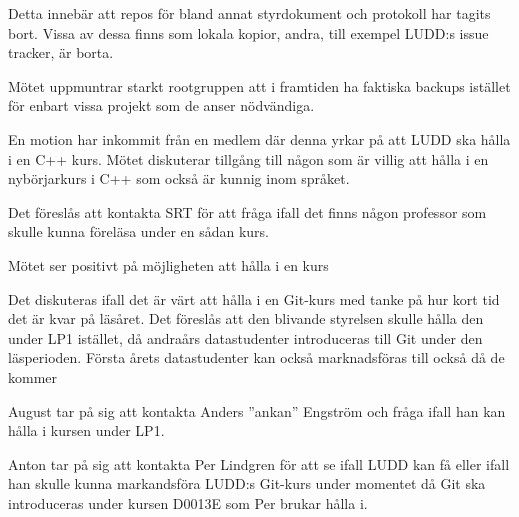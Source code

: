 \documentclass{protokoll}
\begin{document}
Detta innebär att repos för bland annat styrdokument och protokoll har tagits
bort. Vissa av dessa finns som lokala kopior, andra, till exempel LUDD:s issue
tracker, är borta.

Mötet uppmuntrar starkt rootgruppen att i framtiden ha faktiska backups
istället för enbart vissa projekt som de anser nödvändiga.

En motion har inkommit från en medlem där denna yrkar på att LUDD ska hålla
i en C++ kurs. 
Mötet diskuterar tillgång till någon som är villig att hålla i en nybörjarkurs
i C++ som också är kunnig inom språket. 

Det föreslås att kontakta SRT för att fråga ifall det finns någon professor som
skulle kunna föreläsa under en sådan kurs. 

Mötet ser positivt på möjligheten att hålla i en kurs 

Det diskuteras ifall det är värt att hålla i en Git-kurs med tanke på hur kort 
tid det är kvar på läsåret. Det föreslås att den blivande styrelsen skulle 
hålla den under LP1 istället, då andraårs datastudenter introduceras till Git 
under den läsperioden. Första årets datastudenter kan också marknadsföras till
också då de kommer 

August tar på sig att kontakta Anders ''ankan'' Engström och fråga ifall han 
kan hålla i kursen under LP1.

Anton tar på sig att kontakta Per Lindgren för att se ifall LUDD kan få eller
ifall han skulle kunna markandsföra LUDD:s Git-kurs under momentet då Git 
ska introduceras under kursen D0013E som Per brukar hålla i.
\end{document}

